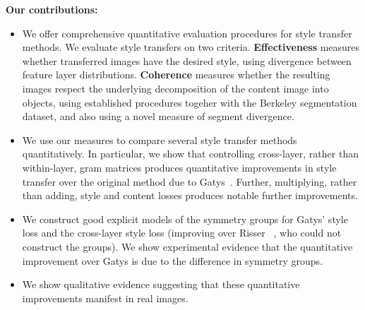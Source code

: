 \documentclass[runningheads]{llncs}
\begin{document}

\textbf{Our contributions:}
\begin{itemize}
\item We offer comprehensive quantitative evaluation procedures for style transfer methods. We evaluate style transfers on
two criteria.  {\bf Effectiveness} measures whether transferred images have the desired style, using divergence between
feature layer distributions.  {\bf Coherence} measures whether the resulting images respect the underlying
decomposition of the content image into objects, using established procedures togeher with the Berkeley segmentation
dataset, and also using a novel measure of segment divergence.
\item We use our measures to compare several style transfer methods quantitatively.  In particular, 
we show that controlling cross-layer, rather than within-layer, gram matrices produces quantitative  improvements in
style transfer over the original method due to Gatys~\cite{}.  Further, multiplying, rather than adding, style and
content losses produces notable further improvements.  
\item We construct good explicit models of the symmetry groups for Gatys' style loss and the cross-layer style loss 
(improving over Risser \ea~\cite{}, who could not construct the groups).  We show experimental evidence that 
the quantitative improvement over Gatys is due to the difference in symmetry groups.
\item We show qualitative evidence suggesting that these quantitative improvements manifest in real images.
\end{itemize}
\end{document}
